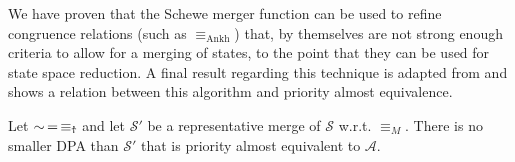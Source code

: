 \vspace{5pt}

We have proven that the Schewe merger function can be used to refine congruence relations (such as $\equiv_\text{Ankh}$) that, by themselves are not strong enough criteria to allow for a merging of states, to the point that they can be used for state space reduction. A final result regarding this technique is adapted from \cite{Schewe2010} and shows a relation between this algorithm and priority almost equivalence.



\begin{lem}
	Let $\sim \,=\, \equiv_\text{\Ankh}$ and let $\mathcal{S}'$ be a representative merge of $\mathcal{S}$ w.r.t. $\equiv_M$. There is no smaller DPA than $\mathcal{S}'$ that is priority almost equivalent to $\mathcal{A}$.
\end{lem} %

